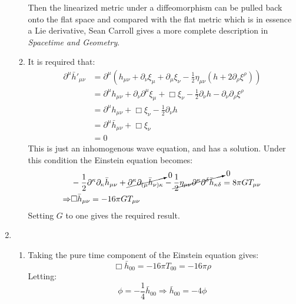 \documentclass[12pt,a4]{article}
\begin{document}
\begin{enumerate}
\begin{enumerate}
        Then the linearized metric under a diffeomorphism can be pulled back onto the flat space and compared with the flat metric which is in essence a Lie derivative, Sean Carroll gives a more complete description in \textit{Spacetime and Geometry}.
      \item 
        It is required that:
        \begin{align*}
          \partial^\mu \bar{h}'_{\mu\nu} &= \partial^\mu \left(h_{\mu\nu} + \partial_\nu \xi_\mu + \partial _\mu \xi_\nu -\frac{1}{2}\eta_{\mu\nu}(h + 2\partial_\rho \xi^\rho)\right)\\
                                         &= \partial^\mu h_{\mu\nu} + \partial_\nu\partial^\mu \xi_\mu + \Box \xi_\nu -\frac{1}{2}\partial_\nu h - \partial_\nu \partial_\rho \xi^\rho\\
                                         &= \partial^\mu h_{\mu\nu}  + \Box \xi_\nu -\frac{1}{2}\partial_\nu h \\
                                         &= \partial^\mu \bar{h}_{\mu\nu}  + \Box \xi_\nu \\
                                         &=0 
        \end{align*}
        This is just an inhomogenous wave equation, and has a solution.
        Under this condition the Einstein equation becomes:
        \begin{align*}
          &-\frac{1}{2}\partial^\kappa \partial_\kappa \bar{h}_{\mu\nu} + \cancelto{0}{\partial^\kappa \partial_{(\mu} \bar{h}_{\nu)\kappa}} - \cancelto{0}{\frac{1}{2}\eta_{\mu\nu} \partial^\kappa \partial^\delta \bar{h}_{\kappa\delta}} = 8 \pi G T_{\mu\nu}\\
          \Rightarrow & \Box \bar{h}_{\mu\nu} = -16\pi G T_{\mu\nu}
        \end{align*}
        Setting $G$ to one gives the required result.
    \end{enumerate}
  \item
    \begin{enumerate}
      \item
        Taking the pure time component of the Einstein equation gives:
        \begin{equation*}
          \Box \bar{h}_{00} = - 16\pi T_{00} = -16 \pi \rho 
        \end{equation*}
        Letting:
        \begin{equation*}
          \phi = - \frac{1}{4} \bar{h}_{00} \Rightarrow \bar{h}_{00} = - 4 \phi
        \end{equation*}

\end{enumerate}
\end{enumerate}
\end{document}
